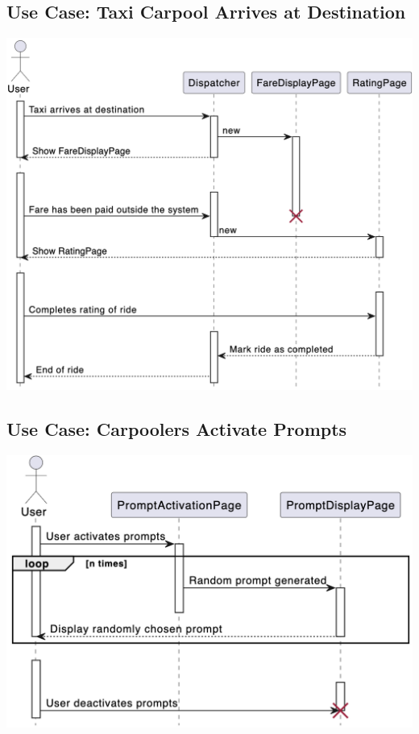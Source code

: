 \documentclass[]{article}
\begin{document}
\subsection*{Use Case: Taxi Carpool Arrives at Destination}
\includegraphics[scale=0.45]{Sequence Diagrams/GS6.png}

\subsection*{Use Case: Carpoolers Activate Prompts}
\includegraphics[scale=0.45]{Sequence Diagrams/GS7.png}
\end{document}
